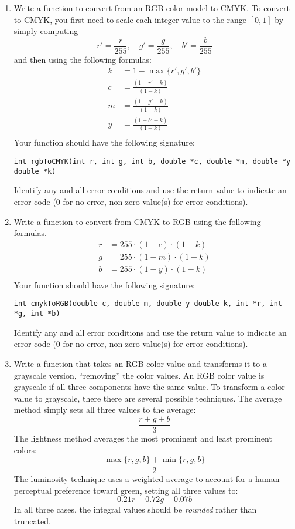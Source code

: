 \documentclass[12pt]{scrartcl}
\begin{document}
\begin{enumerate}
\item Write a function to convert from an RGB color model to CMYK.  To 
convert to CMYK, you first need to scale each integer value to the range 
$[0, 1]$ by simply computing
	$$r' = \frac{r}{255}, \quad g' = \frac{g}{255}, \quad b' = \frac{b}{255}$$
	and then using the following formulas:
\begin{align*}
k & = 1-\max\{r', g', b'\} \\
c & = \frac{(1-r'-k)}{(1-k)} \\
m & = \frac{(1-g'-k)}{(1-k)} \\
y & = \frac{(1-b'-k)}{(1-k)} \\
\end{align*}
Your function should have the following signature:

\texttt{int rgbToCMYK(int r, int g, int b, double *c, double *m, double *y double *k)}

Identify any and all error conditions and use the return value to indicate
an error code (0 for no error, non-zero value(s) for error conditions).

\item Write a function to convert from CMYK to RGB using the following formulas.
\begin{align*}
r & = 255 \cdot (1 - c) \cdot (1-k) \\
g & = 255 \cdot (1 - m) \cdot (1-k) \\
b & = 255 \cdot (1 - y) \cdot (1-k) \\
\end{align*}
Your function should have the following signature:

\texttt{int cmykToRGB(double c, double m, double y double k, int *r, int *g, int *b)}

Identify any and all error conditions and use the return value to indicate
an error code (0 for no error, non-zero value(s) for error conditions).

\item Write a function that takes an RGB color value and transforms it 
to a grayscale version, ``removing'' the color values.  An RGB color 
value is grayscale if all three components have the same value.  To 
transform a color value to grayscale, there there are several possible 
techniques.  The average method simply sets all three values to the 
average:
  $$\frac{r + g + b}{3}$$
The lightness method averages the most prominent and least prominent 
colors:
  $$\frac{\max\{r, g, b\} + \min\{r, g, b\}}{2}$$
The luminosity technique uses a weighted average to account for a human 
perceptual preference toward green, setting all three values to:
  $$0.21 r + 0.72 g + 0.07 b$$
In all three cases, the integral values should be \emph{rounded} rather 
than truncated.


\end{enumerate}
\end{document}
